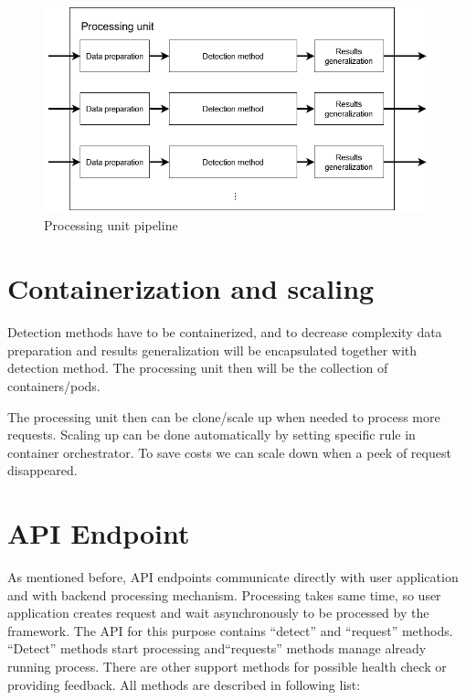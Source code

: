 \begin{figure}[H]
    \centering
    \includegraphics[width=.65\linewidth]{other-fig/framework_architecture_processing_unit.png}        
    \caption{Processing unit pipeline}
\label{fig:framework_architecture_processing_unit}
\end{figure}

\section{Containerization and scaling}

Detection methods have to be containerized, and to decrease complexity data preparation and results generalization will be encapsulated together with detection method. The processing unit then will be the collection of containers/pods.

The processing unit then can be clone/scale up when needed to process more requests. Scaling up can be done automatically by setting specific rule in container orchestrator. To save costs we can scale down when a peek of request disappeared.

\section{API Endpoint}

As mentioned before, API endpoints communicate directly with user application and with backend processing mechanism. Processing takes same time, so user application creates request and wait asynchronously to be processed by the framework. The API for this purpose contains “detect” and “request” methods. “Detect” methods start processing and“requests” methods manage already running process. There are other support methods for possible health check or providing feedback. All methods are described in following list:

